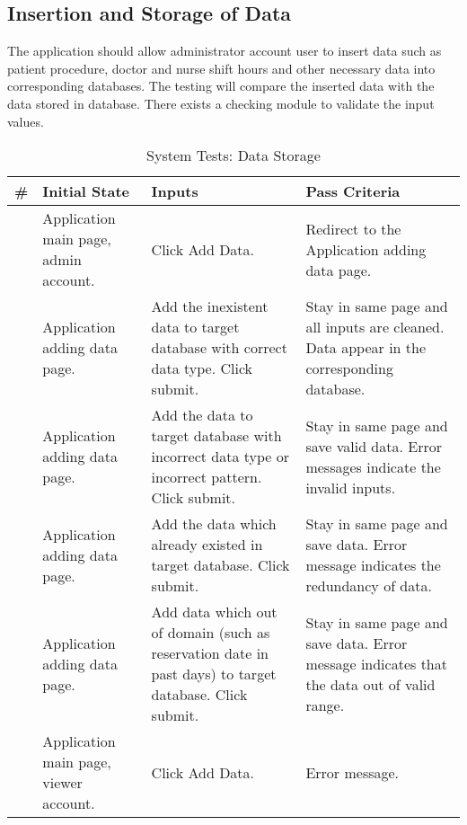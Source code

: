 \documentclass[12pt]{article}
\newcounter{TestCounter}
\begin{document}
\subsection{Insertion and Storage of Data} 
The application should allow administrator account user to insert data such as patient procedure, doctor and nurse shift hours and other necessary data into corresponding databases. The testing will compare the inserted data with the data stored in database. There exists a checking module to validate the input values.
\begin{center}
	\begin{longtable}{c>{\raggedright\arraybackslash}p{4.8cm} >{\raggedright\arraybackslash}p{3cm}>{\raggedright\arraybackslash}p{3cm}}
		\caption{System Tests: Data Storage}\label{DataStorage_SystemTests}\\
		\toprule
		\bf \# & \bf Initial State & \bf Inputs & \bf Pass Criteria \\\midrule
		\stepcounter{TestCounter}\arabic{TestCounter} 
		& Application main page, admin account.
		& Click Add Data.
		& Redirect to the Application adding data page.
		\\\midrule
		\stepcounter{TestCounter}\arabic{TestCounter} 
		& Application adding data page.
		& Add the inexistent data to target database with correct data type. Click submit.
		& Stay in same page and all inputs are cleaned. Data appear in the corresponding database.
		\\\midrule
		\stepcounter{TestCounter}\arabic{TestCounter} 
		& Application adding data page.
		& Add the data to target database with incorrect data type or incorrect pattern.
		Click submit.
		& Stay in same page and save valid data. Error messages indicate the invalid inputs.
		\\\midrule
		\stepcounter{TestCounter}\arabic{TestCounter} 
		& Application adding data page.
		& Add the data which already existed in target database. Click submit.
		& Stay in same page and save data. Error message indicates the redundancy of data.
		\\\midrule
		\stepcounter{TestCounter}\arabic{TestCounter} 
		& Application adding data page.
		& Add data which out of domain (such as reservation date in past days) to target database. Click submit.
		& Stay in same page and save data. Error message indicates that the data out of valid range.
		\\\midrule
		\stepcounter{TestCounter}\arabic{TestCounter} 
		& Application main page, viewer account.
		& Click Add Data. 
		& Error message.
		\\\midrule
		\bottomrule
	\end{longtable}
\end{center}
\end{document}
